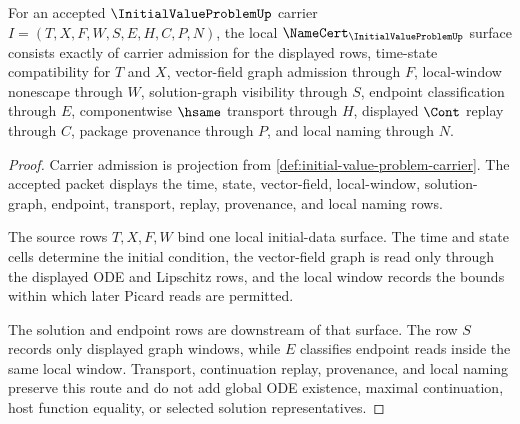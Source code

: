 \begin{theorem}
\label{thm:initial-value-problem-namecert-obligations}
For an accepted $\InitialValueProblemUp$ carrier $I=(T,X,F,W,S,E,H,C,P,N)$, the local $\NameCert_{\InitialValueProblemUp}$ surface consists exactly of carrier admission for the displayed rows, time-state compatibility for $T$ and $X$, vector-field graph admission through $F$, local-window nonescape through $W$, solution-graph visibility through $S$, endpoint classification through $E$, componentwise $\hsame$ transport through $H$, displayed $\Cont$ replay through $C$, package provenance through $P$, and local naming through $N$.
\end{theorem}
\begin{proof}
Carrier admission is projection from \autoref{def:initial-value-problem-carrier}. The accepted packet displays the time, state, vector-field, local-window, solution-graph, endpoint, transport, replay, provenance, and local naming rows.

The source rows $T,X,F,W$ bind one local initial-data surface. The time and state cells determine the initial condition, the vector-field graph is read only through the displayed ODE and Lipschitz rows, and the local window records the bounds within which later Picard reads are permitted.

The solution and endpoint rows are downstream of that surface. The row $S$ records only displayed graph windows, while $E$ classifies endpoint reads inside the same local window. Transport, continuation replay, provenance, and local naming preserve this route and do not add global ODE existence, maximal continuation, host function equality, or selected solution representatives.
\end{proof}

